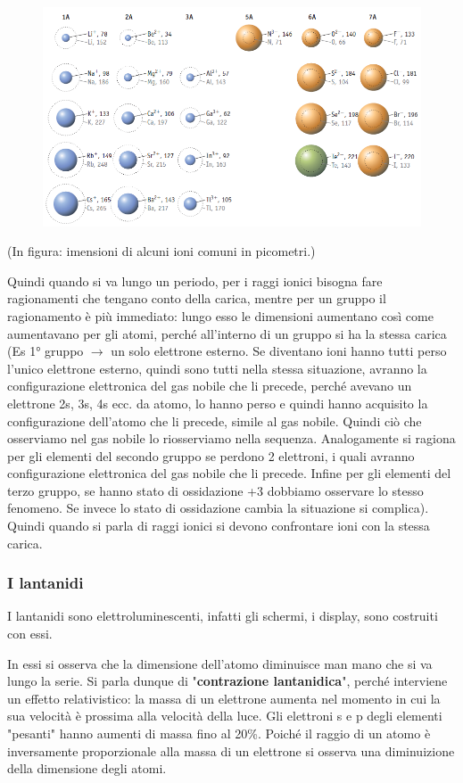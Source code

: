 \begin{figure}[htp]
    \centering
    \includegraphics[width=13cm]{immagini/raggi-ionici.png}
\end{figure}

(In figura: imensioni di alcuni ioni comuni in picometri.)

Quindi quando si va lungo un periodo, per i raggi ionici bisogna fare ragionamenti che tengano conto della carica, mentre per un gruppo il ragionamento è più immediato: lungo esso le dimensioni aumentano così come aumentavano per gli atomi, perché all'interno di un gruppo si ha la stessa carica (Es 1° gruppo $\rightarrow$ un solo elettrone esterno. Se diventano ioni hanno tutti perso l'unico elettrone esterno, quindi sono tutti nella stessa situazione, avranno la configurazione elettronica del gas nobile che li precede, perché avevano un elettrone 2s, 3s, 4s ecc. da atomo, lo hanno perso e quindi hanno acquisito la configurazione dell'atomo che li precede, simile al gas nobile. Quindi ciò che osserviamo nel gas nobile lo riosserviamo nella sequenza. Analogamente si ragiona per gli elementi del secondo gruppo se perdono 2 elettroni, i quali avranno configurazione elettronica del gas nobile che li precede. Infine per gli elementi del terzo gruppo, se hanno stato di ossidazione +3 dobbiamo osservare lo stesso fenomeno. Se invece lo stato di ossidazione cambia la situazione si complica). Quindi quando si parla di raggi ionici si devono confrontare ioni con la stessa carica.
\subsubsection{I lantanidi}
I lantanidi sono elettroluminescenti, infatti gli schermi, i display, sono costruiti con essi.

In essi si osserva che la dimensione dell'atomo diminuisce man mano che si va lungo la serie. Si parla dunque di "\textbf{contrazione lantanidica}", perché interviene un effetto relativistico: la massa di un elettrone aumenta nel momento in cui la sua velocità è prossima alla velocità della luce. Gli elettroni s e p degli elementi "pesanti" hanno aumenti di massa fino al 20\%. Poiché il raggio di un atomo è inversamente proporzionale alla massa di un elettrone si osserva una diminuizione della dimensione degli atomi.
